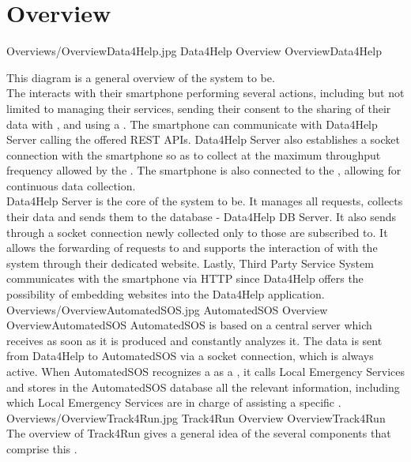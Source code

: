 \documentclass[../../DD.tex]{subfiles}
\begin{document}
\section{Overview \label{sect:2.1}}

	\image {13cm} {Overviews/OverviewData4Help.jpg} {Data4Help Overview} {OverviewData4Help}

	This diagram is a general overview of the system to be.\\
	The  interacts with their smartphone performing several actions, including but not limited to managing their services, sending their consent to the sharing of their data with , and using a . The smartphone can communicate with Data4Help Server calling the offered REST APIs. Data4Help Server also establishes a socket connection with the smartphone so as to collect  at the maximum throughput frequency allowed by the  . The smartphone is also connected to the , allowing for continuous data collection.\\
	Data4Help Server is the core of the system to be. It manages all  requests, collects their data and sends them to the database - Data4Help DB Server. It also sends through a socket connection newly collected  only to those  are subscribed to. It allows the forwarding of  requests to  and supports the interaction of  with the system through their dedicated website.
	Lastly, Third Party Service System communicates with the  smartphone via HTTP since Data4Help offers the possibility of embedding  websites into the Data4Help application.
	\image {13cm} {Overviews/OverviewAutomatedSOS.jpg} {AutomatedSOS Overview} {OverviewAutomatedSOS}
	AutomatedSOS is based on a central server which receives  as soon as it is produced and constantly analyzes it. The data is sent from Data4Help to AutomatedSOS via a socket connection, which is always active. When AutomatedSOS recognizes a  as a , it calls Local Emergency Services and stores in the AutomatedSOS database all the relevant information, including which Local Emergency Services are in charge of assisting a specific .
	\image {13cm} {Overviews/OverviewTrack4Run.jpg} {Track4Run Overview} {OverviewTrack4Run}
	The overview of Track4Run gives a general idea of the several components that comprise this .\\
\end{document}
